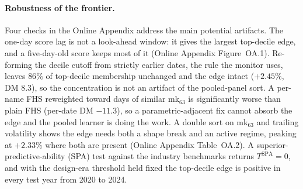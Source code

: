 \documentclass[11pt]{article}
\theoremstyle{remark}
\begin{document}
\paragraph{Robustness of the frontier.} Four checks in the Online Appendix address the main potential artifacts. The one-day score lag is not a
look-ahead window: it gives the largest top-decile edge, and a
five-day-old score keeps most of it (Online Appendix Figure~OA.1).
Re-forming the decile cutoff from strictly earlier dates, the rule the
monitor uses, leaves $86\%$ of top-decile membership unchanged and the
edge intact ($+2.45\%$, DM 8.3), so the concentration is not an artifact
of the pooled-panel sort. A per-name FHS reweighted toward days of
similar mk$_{63}$ is significantly worse than plain FHS (per-date DM
$-11.3$), so a parametric-adjacent fix cannot absorb the edge and the
pooled learner is doing the work. A double sort on mk$_{63}$ and trailing
volatility shows the edge needs both a shape break and an active regime,
peaking at $+2.33\%$ where both are present (Online Appendix
Table~OA.2). A superior-predictive-ability (SPA) test \citep{hansen2005spa}
against the industry benchmarks returns $T^{\mathrm{SPA}}=0$, and with
the design-era threshold held fixed the top-decile edge is positive in
every test year from 2020 to 2024.
\end{document}
